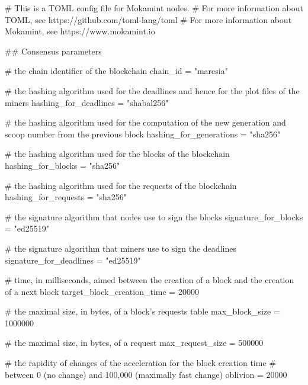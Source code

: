 \begin{shellbox}\begin{ttlst}
# This is a TOML config file for Mokamint nodes.
# For more information about TOML, see https://github.com/toml-lang/toml
# For more information about Mokamint, see https://www.mokamint.io

## Consensus parameters

# the chain identifier of the blockchain
chain_id = "maresia"

# the hashing algorithm used for the deadlines and hence for the plot files of the miners
hashing_for_deadlines = "shabal256"

# the hashing algorithm used for the computation of the new generation and scoop number from the previous block
hashing_for_generations = "sha256"

# the hashing algorithm used for the blocks of the blockchain
hashing_for_blocks = "sha256"

# the hashing algorithm used for the requests of the blockchain
hashing_for_requests = "sha256"

# the signature algorithm that nodes use to sign the blocks
signature_for_blocks = "ed25519"

# the signature algorithm that miners use to sign the deadlines
signature_for_deadlines = "ed25519"

# time, in milliseconds, aimed between the creation of a block and the creation of a next block
target_block_creation_time = 20000

# the maximal size, in bytes, of a block's requests table
max_block_size = 1000000

# the maximal size, in bytes, of a request
max_request_size = 500000

# the rapidity of changes of the acceleration for the block creation time
# between 0 (no change) and 100,000 (maximally fast change)
oblivion = 20000

\end{ttlst}\end{shellbox}
